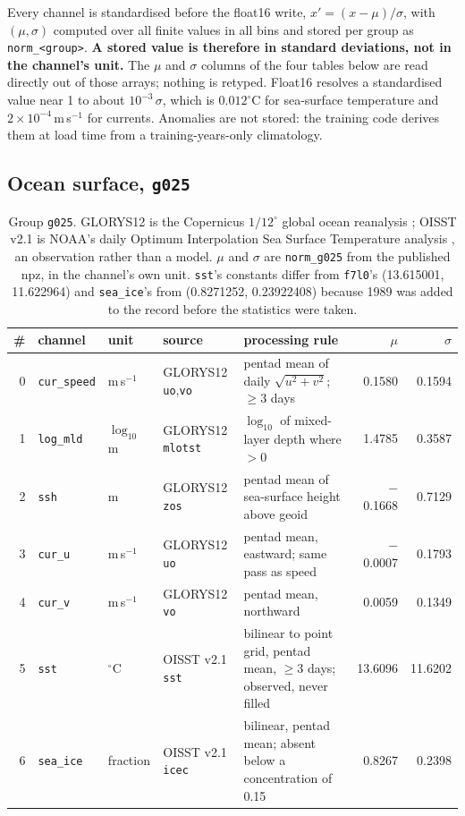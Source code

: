 \documentclass[10pt]{article}
\newcommand{\code}[1]{\texttt{#1}}
\begin{document}
Every channel is standardised before the float16 write, $x' = (x-\mu)/\sigma$,
with $(\mu,\sigma)$ computed over all finite values in all bins and stored per
group as \code{norm\_<group>}. \textbf{A stored value is therefore in standard
deviations, not in the channel's unit.} The $\mu$ and $\sigma$ columns of the
four tables below are read directly out of those arrays; nothing is retyped.
Float16 resolves a standardised value near 1 to about $10^{-3}\,\sigma$, which
is $0.012^\circ$C for sea-surface temperature and
$2\times10^{-4}$\,m\,s$^{-1}$ for currents. Anomalies are not stored: the
training code derives them at load time from a training-years-only climatology.

\subsection{Ocean surface, \code{g025}}

\begin{table}[h]
\centering\setlength{\tabcolsep}{4pt}\footnotesize
\begin{tabular}{@{}rl>{\raggedright\arraybackslash}p{1.5cm}>{\raggedright\arraybackslash}p{2.5cm}>{\raggedright\arraybackslash}p{4.7cm}rr@{}}
\toprule
\# & channel & unit & source & processing rule & $\mu$ & $\sigma$ \\
\midrule
0 & \code{cur\_speed} & m\,s$^{-1}$ & GLORYS12 \code{uo},\code{vo} & pentad mean of daily $\sqrt{u^2+v^2}$; $\geq3$ days & 0.1580 & 0.1594 \\
1 & \code{log\_mld} & $\log_{10}$\,m & GLORYS12 \code{mlotst} & $\log_{10}$ of mixed-layer depth where $>0$ & 1.4785 & 0.3587 \\
2 & \code{ssh} & m & GLORYS12 \code{zos} & pentad mean of sea-surface height above geoid & $-$0.1668 & 0.7129 \\
3 & \code{cur\_u} & m\,s$^{-1}$ & GLORYS12 \code{uo} & pentad mean, eastward; same pass as speed & $-$0.0007 & 0.1793 \\
4 & \code{cur\_v} & m\,s$^{-1}$ & GLORYS12 \code{vo} & pentad mean, northward & 0.0059 & 0.1349 \\
5 & \code{sst} & $^\circ$C & OISST v2.1 \code{sst} & bilinear to point grid, pentad mean, $\geq3$ days; observed, never filled & 13.6096 & 11.6202 \\
6 & \code{sea\_ice} & fraction & OISST v2.1 \code{icec} & bilinear, pentad mean; absent below a concentration of 0.15 & 0.8267 & 0.2398 \\
\bottomrule
\end{tabular}
\caption{Group \code{g025}. GLORYS12 is the Copernicus $1/12^\circ$ global
ocean reanalysis \cite{glorys}; OISST v2.1 is NOAA's daily Optimum
Interpolation Sea Surface Temperature analysis \cite{oisst}, an observation
rather than a model. $\mu$ and $\sigma$ are \code{norm\_g025} from the
published npz, in the channel's own unit. \code{sst}'s constants differ from
\code{f7l0}'s (13.615001, 11.622964) and \code{sea\_ice}'s from
(0.8271252, 0.23922408) because 1989 was added to the record before the
statistics were taken.}
\end{table}
\end{document}
